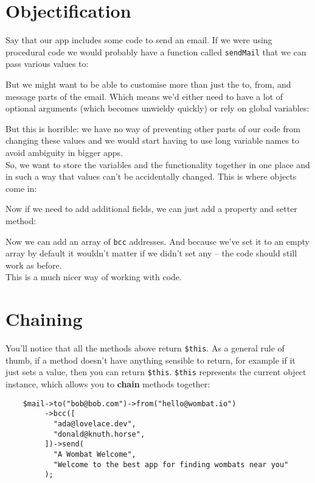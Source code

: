 \section{Objectification}

Say that our app includes some code to send an email. If we were using procedural code we would probably have a function called \texttt{sendMail} that we can pass various values to:


But we might want to be able to customise more than just the to, from, and message parts of the email. Which means we'd either need to have a lot of optional arguments (which becomes unwieldy quickly) or rely on global variables:


But this is horrible: we have no way of preventing other parts of our code from changing these values and we would start having to use long variable names to avoid ambiguity in bigger apps.
\\

So, we want to store the variables and the functionality together in one place and in such a way that values can't be accidentally changed. This is where objects come in:


Now if we need to add additional fields, we can just add a property and setter method:


Now we can add an array of \texttt{bcc} addresses. And because we've set it to an empty array by default it wouldn't matter if we didn't set any – the code should still work as before.
\\

This is a much nicer way of working with code.


\section{Chaining}

You'll notice that all the methods above return \texttt{\$this}. As a general rule of thumb, if a method doesn't have anything sensible to return, for example if it just sets a value, then you can return \texttt{\$this}. \texttt{\$this} represents the current object instance, which allows you to \textbf{chain} methods together:

\begin{verbatim}
    $mail->to("bob@bob.com")->from("hello@wombat.io")
         ->bcc([
           "ada@lovelace.dev",
           "donald@knuth.horse",
         ])->send(
           "A Wombat Welcome",
           "Welcome to the best app for finding wombats near you"
         );
\end{verbatim}

